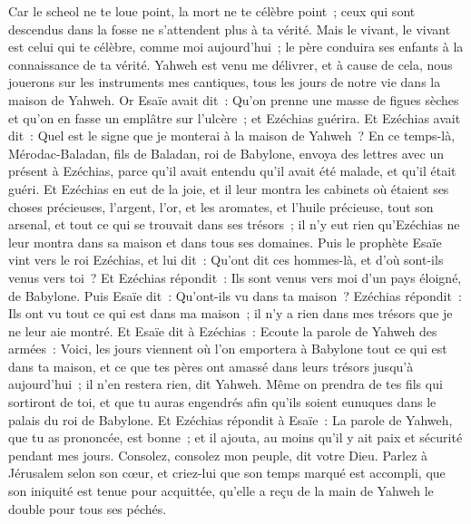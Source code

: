 \begin{multicols}{2}
Car le scheol ne te loue point, la mort ne te célèbre point~; ceux qui sont descendus dans la fosse ne s'attendent plus à ta vérité.
Mais le vivant, le vivant est celui qui te célèbre, comme moi aujourd'hui~; le père conduira ses enfants à la connaissance de ta vérité.
Yahweh est venu me délivrer, et à cause de cela, nous jouerons sur les instruments mes cantiques, tous les jours de notre vie dans la maison de Yahweh.
Or Esaïe avait dit~: Qu'on prenne une masse de figues sèches et qu'on en fasse un emplâtre sur l'ulcère~; et Ezéchias guérira.
Et Ezéchias avait dit~: Quel est le signe que je monterai à la maison de Yahweh~?
\VerseOne{}En ce temps-là, Mérodac-Baladan, fils de Baladan, roi de Babylone, envoya des lettres avec un présent à Ezéchias, parce qu'il avait entendu qu'il avait été malade, et qu'il était guéri.
Et Ezéchias en eut de la joie, et il leur montra les cabinets où étaient ses choses précieuses, l'argent, l'or, et les aromates, et l'huile précieuse, tout son arsenal, et tout ce qui se trouvait dans ses trésors~; il n'y eut rien qu'Ezéchias ne leur montra dans sa maison et dans tous ses domaines.
Puis le prophète Esaïe vint vers le roi Ezéchias, et lui dit~: Qu'ont dit ces hommes-là, et d'où sont-ils venus vers toi~? Et Ezéchias répondit~: Ils sont venus vers moi d'un pays éloigné, de Babylone.
Puis Esaïe dit~: Qu'ont-ils vu dans ta maison~? Ezéchias répondit~: Ils ont vu tout ce qui est dans ma maison~; il n'y a rien dans mes trésors que je ne leur aie montré.
Et Esaïe dit à Ezéchias~: Ecoute la parole de Yahweh des armées~:
Voici, les jours viennent où l'on emportera à Babylone tout ce qui est dans ta maison, et ce que tes pères ont amassé dans leurs trésors jusqu'à aujourd'hui~; il n'en restera rien, dit Yahweh.
Même on prendra de tes fils qui sortiront de toi, et que tu auras engendrés afin qu'ils soient eunuques dans le palais du roi de Babylone.
Et Ezéchias répondit à Esaïe~: La parole de Yahweh, que tu as prononcée, est bonne~; et il ajouta, au moins qu'il y ait paix et sécurité pendant mes jours.
\VerseOne{}Consolez, consolez mon peuple, dit votre Dieu.
Parlez à Jérusalem selon son cœur, et criez-lui que son temps marqué est accompli, que son iniquité est tenue pour acquittée, qu'elle a reçu de la main de Yahweh le double pour tous ses péchés.

\end{multicols}
